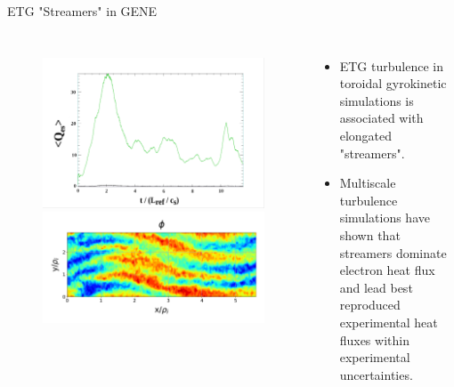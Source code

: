 \documentclass[aspectratio=43]{beamer}
\begin{document}
   \begin{frame}{ETG "Streamers" in GENE}
      \begin{columns}
         \begin{figure}
            \hspace*{-.3cm}\includegraphics[scale=.2]{Images/etgHeatFlux.pdf}
            \hspace*{-.3cm}\includegraphics[scale=.2]{Images/genePhiETG_sat2.pdf}
         \end{figure}
         \begin{itemize}
            \item ETG turbulence in toroidal gyrokinetic simulations is associated with elongated "streamers".
            \item Multiscale turbulence simulations have shown that streamers dominate electron heat flux and lead
            best reproduced experimental heat fluxes within experimental uncertainties.
         \end{itemize}
      \end{columns}
   \end{frame}
\end{document}
